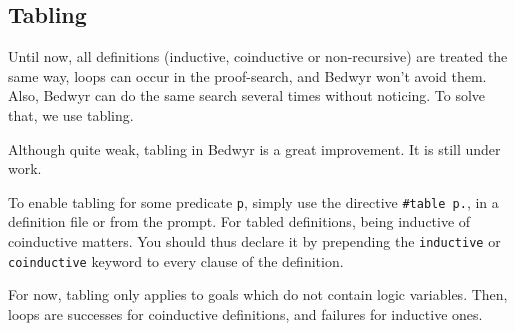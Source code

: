 \documentclass{article}
\begin{document}
\subsection{Tabling}

Until now, all definitions (inductive, coinductive or non-recursive)
are treated the same way, loops can occur in the proof-search, and Bedwyr
won't avoid them. Also, Bedwyr can do the same search several times without
noticing. To solve that, we use tabling.

Although quite weak, tabling in Bedwyr is a great improvement.
It is still under work.

To enable tabling for some predicate \texttt{p}, simply use the directive
\texttt{\#table p.}, in a definition file or from the prompt.
For tabled definitions, being inductive of coinductive matters.
You should thus declare it by prepending the \texttt{inductive} or
\texttt{coinductive} keyword to every clause of the definition.

For now, tabling only applies to goals which do not contain logic variables.
Then, loops are successes for coinductive definitions,
and failures for inductive ones.
\end{document}
